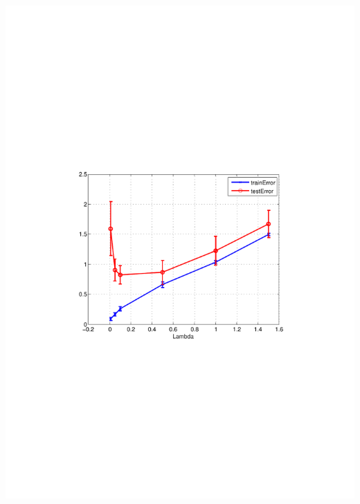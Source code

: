 \begin{minipage}{\textwidth}
  \begin{minipage}[b]{0.45\textwidth}
    \centering
    \includegraphics[clip, trim=4cm 9.2cm 3.5cm 9cm, width=\textwidth]{figures/ALS_lambda.pdf}
    \label{fig:ALS_lambdas}
  \end{minipage}
  \hfill
  \begin{minipage}[b]{0.45\textwidth}
	\centering

\end{minipage}
\end{minipage}
